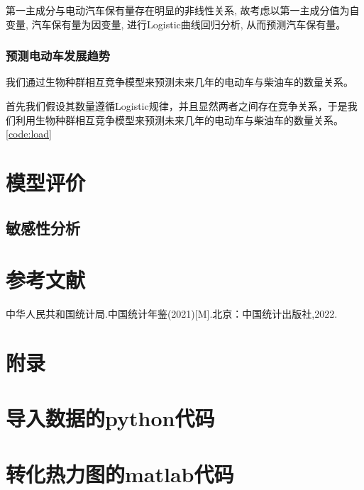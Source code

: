\documentclass[12pt, a4paper, oneside]{ctexart}
\begin{document}
第一主成分与电动汽车保有量存在明显的非线性关系, 故考虑以第一主成分值为自变量, 汽车保有量为因变量, 进行Logistic曲线回归分析, 从而预测汽车保有量。

\subsubsection{预测电动车发展趋势}
我们通过生物种群相互竞争模型来预测未来几年的电动车与柴油车的数量关系。

首先我们假设其数量遵循Logistic规律，并且显然两者之间存在竞争关系，于是我们利用生物种群相互竞争模型来预测未来几年的电动车与柴油车的数量关系。\ref{code:load}



\section{模型评价}
\subsection{敏感性分析}

\section{参考文献}
\begin{thebibliography}{99}
    中华人民共和国统计局.中国统计年鉴(2021)[M].北京：中国统计出版社,2022.
\end{thebibliography}
\newpage
\section{附录}
\appendix
\section{导入数据的python代码}
\lstset{language=python}




\section{转化热力图的matlab代码}

\end{document}
